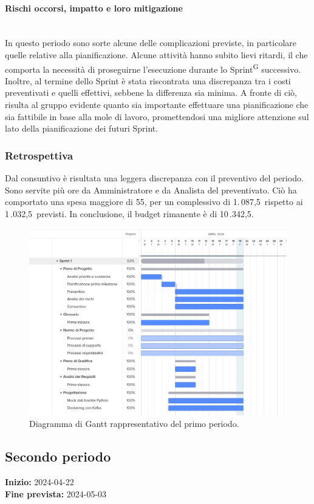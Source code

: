 \documentclass[8pt]{article}
\newcommand{\glossterm}[1]{#1\textsuperscript{G}} %
\newcommand{\subsubsubsection}[1]{\paragraph{#1}\mbox{}\\}
\begin{document}
\subsubsubsection{Rischi occorsi, impatto e loro mitigazione}
In questo periodo sono sorte alcune delle complicazioni previste, in particolare quelle relative alla pianificazione. Alcune attività hanno subito lievi ritardi, il che comporta la necessità di proseguirne l'esecuzione durante lo \glossterm{Sprint} successivo. Inoltre, al termine dello Sprint è stata riscontrata una discrepanza tra i costi preventivati e quelli effettivi, sebbene la differenza sia minima. A fronte di ciò, risulta al gruppo evidente quanto sia importante effettuare una pianificazione che sia fattibile in base alla mole di lavoro, promettendosi una migliore attenzione sul lato della pianificazione dei futuri Sprint.
\subsubsection{Retrospettiva}
Dal consuntivo è risultata una leggera discrepanza con il preventivo del periodo. Sono servite più ore da Amministratore e da Analista del preventivato.
Ciò ha comportato una spesa maggiore di 55\;\texteuro, per un complessivo di 1.\,087,5\;\texteuro\
rispetto ai 1\,.032,5\;\texteuro\ previsti.
In conclusione, il budget rimanente è di 10\,.342,5\;\texteuro. 
\begin{figure}[h!]
    \centering
    \includegraphics[width=15cm]{./images_pdp/gantt1.jpeg}
    \caption{Diagramma di Gantt rappresentativo del primo periodo.}
    \label{figure:Diagramma di Gantt rappresentativo del primo periodo}
\end{figure}
\clearpage
\newpage
\subsection{Secondo periodo} \label{sec:2_rtb}
\textbf{Inizio:} 2024-04-22\\
\textbf{Fine prevista:} 2024-05-03
\end{document}
